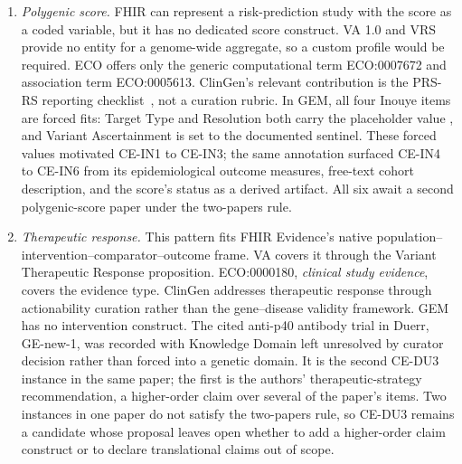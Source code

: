 \begin{enumerate}
  \item \emph{Polygenic score.} FHIR can represent a risk-prediction study
    with the score as a coded variable, but it has no dedicated score
    construct. VA 1.0 and VRS provide no entity for a genome-wide aggregate,
    so a custom profile would be required. ECO offers only the generic
    computational term ECO:0007672 and association term ECO:0005613.
    ClinGen's relevant contribution is the PRS-RS reporting
    checklist~\cite{wand2021}, not a curation rubric. In GEM, all four
    Inouye items are forced fits: Target Type and Resolution both carry the
    placeholder value , and Variant Ascertainment is set to
    the documented sentinel. These forced values motivated CE-IN1 to
    CE-IN3; the same annotation surfaced CE-IN4 to CE-IN6 from its
    epidemiological outcome measures, free-text cohort description, and the
    score's status as a derived artifact. All six await a second
    polygenic-score paper under the two-papers rule.

  \item \emph{Therapeutic response.} This pattern fits FHIR Evidence's
    native population--intervention--comparator--outcome frame. VA covers
    it through the Variant Therapeutic Response proposition. ECO:0000180,
    \emph{clinical study evidence}, covers the evidence type. ClinGen
    addresses therapeutic response through actionability curation rather
    than the gene--disease validity framework. GEM has no intervention
    construct. The cited anti-p40 antibody trial in Duerr, GE-new-1, was
    recorded with Knowledge Domain left unresolved by curator decision rather
    than forced into a genetic domain. It is the second CE-DU3 instance in
    the same paper; the first is the authors' therapeutic-strategy
    recommendation, a higher-order claim over several of the paper's items.
    Two instances in one paper do not satisfy the two-papers rule, so CE-DU3
    remains a candidate whose proposal leaves open whether to add a
    higher-order claim construct or to declare translational claims out of
    scope.


\end{enumerate}
